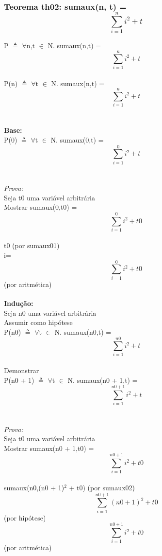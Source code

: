 \documentclass{article}
\begin{document}
\subsubsection{Teorema th02: sumaux(n, t) = $$\sum_{i=1}^{n} i^{2} + t$$}
P $\triangleq$ $\forall$n,t $\in$ N. sumaux(n,t) = $$\sum_{i=1}^{n} i^{2} + t$$
\\P(n) $\triangleq$ $\forall$t $\in$ N. sumaux(n,t) = $$\sum_{i=1}^{n} i^{2} + t$$
\\
\\\textbf{Base:}
\\P(0) $\triangleq$ $\forall$t $\in$ N. sumaux(0,t) = $$\sum_{i=1}^{0} i^{2} + t$$
\\
\\\textit{Prova:}
\\Seja t0 uma variável arbitrária
\\Mostrar sumaux(0,t0) = $$\sum_{i=1}^{0} i^{2} + t0$$
\\t0 (por sumaux01)
\\i=$$\sum_{i=1}^{0} i^{2} + t0$$ (por aritmética)
\\
\\\textbf{Indução:}
\\Seja n0 uma variável arbitrária
\\Assumir como hipótese \\P(n0) $\triangleq$ $\forall$t $\in$ N. sumaux(n0,t) = $$\sum_{i=1}^{n0} i^{2} + t$$
\\Demonstrar \\P(n0 + 1) $\triangleq$ $\forall$t $\in$ N. sumaux(n0 + 1,t) = $$\sum_{i=1}^{n0 + 1} i^{2} + t$$
\\
\\\textit{Prova:}
\\Seja t0 uma variável arbitrária 
\\Mostrar sumaux(n0 + 1,t0) = $$\sum_{i=1}^{n0 + 1} i^{2} + t0$$
\\sumaux(n0,(n0 + 1)$^{2}$ + t0) (por sumaux02)
\\$$\sum_{i=1}^{n0 + 1} (n0 + 1)^{2} + t0$$ (por hipótese)
\\$$\sum_{i=1}^{n0 + 1} i^{2} + t0$$ (por aritmética)
\end{document}
